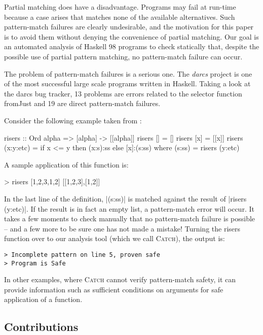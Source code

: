 \documentclass[preprint]{sigplanconf}
\newcommand{\C}[1]{\textsf{#1}}
\newcommand{\catch}{\textsc{Catch}}
\begin{document}
Partial matching does have a disadvantage.  Programs may fail at run-time
because a case arises that matches none of the available alternatives.
Such pattern-match failures are clearly undesirable, and the motivation
for this paper is to avoid them without denying the convenience of
partial matching.  Our goal is an automated analysis of Haskell 98 programs
to check statically that, despite the possible use of partial pattern
matching, no pattern-match failure can occur.

The problem of pattern-match failures is a serious one. The \textit{darcs} project \citep{darcs} is one of the most successful large scale programs written in Haskell. Taking a look at the darcs bug tracker, 13 problems are errors related to the selector function \C{fromJust} and 19 are direct pattern-match failures.

Consider the following example taken from \citet{me:catch_tfp}:

\begin{code}
risers :: Ord alpha => [alpha] -> [[alpha]]
risers [] = []
risers [x] = [[x]]
risers (x:y:etc) = if x <= y then (x:s):ss else [x]:(s:ss)
    where (s:ss) = risers (y:etc)
\end{code}

A sample application of this function is:

\ignore\begin{code}
> risers [1,2,3,1,2]
[[1,2,3],[1,2]]
\end{code}

In the last line of the definition, |(s:ss)| is matched against the result of |risers (y:etc)|. If the result is in fact an empty list, a pattern-match error will occur. It takes a few moments to check manually that no pattern-match failure is possible -- and a few more to be sure one has not made a mistake! Turning the \C{risers} function over to our analysis tool (which we call \catch{}), the output is:

\begin{verbatim}
> Incomplete pattern on line 5, proven safe
> Program is Safe
\end{verbatim}

In other examples, where \catch{} cannot verify pattern-match safety, it can provide information such as sufficient conditions on arguments for safe application of a function.

\subsection{Contributions}
\end{document}
